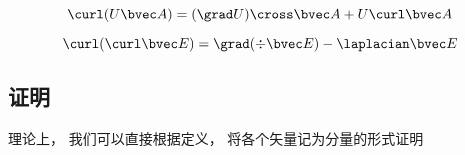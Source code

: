 
\begin{equation}
\curl(U\bvec A) = (\grad U) \cross\bvec A + U \curl\bvec A
\end{equation}

\begin{equation}
\curl(\curl \bvec E) = \grad(\div\bvec E) - \laplacian \bvec E
\end{equation}

\subsection{证明}
理论上， 我们可以直接根据定义， 将各个矢量记为分量的形式证明
